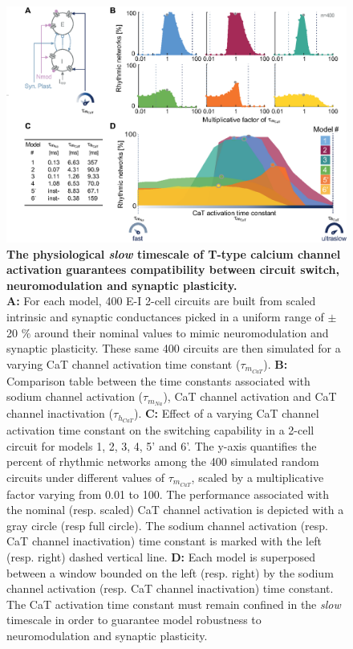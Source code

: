 \begin{figure}[!h]
\includegraphics[scale=0.95]{fig/Plos/Fig3}
\caption{{\bf The physiological \textit{slow} timescale of T-type calcium channel activation guarantees compatibility between circuit switch, neuromodulation and synaptic plasticity.}\\ \textbf{A:} For each model, 400 E-I 2-cell circuits are built from scaled intrinsic and synaptic conductances picked in a uniform range of $\pm$ 20 $\%$ around their nominal values to mimic neuromodulation and synaptic plasticity.  These same 400 circuits are then simulated for a varying  CaT channel activation time constant ($\tau_{m_{CaT}}$). \textbf{B:} Comparison table between the time constants associated with sodium channel activation ($\tau_{m_{Na}}$), CaT channel activation and CaT channel inactivation ($\tau_{h_{CaT}}$). 
\textbf{C:} Effect of a varying CaT channel activation time constant on the switching capability in a 2-cell circuit for models 1, 2, 3, 4, 5' and 6'. The y-axis quantifies the percent of rhythmic networks among the 400 simulated random circuits under different values of $\tau_{m_{CaT}}$, scaled by a multiplicative factor varying from 0.01 to 100. The performance associated with the nominal (resp. scaled) CaT channel activation is depicted with a gray circle (resp full circle). The sodium channel activation (resp. CaT channel inactivation) time constant is marked with the left (resp. right) dashed vertical line.   
\textbf{D:} Each model is superposed between a window bounded on the left (resp. right) by the sodium channel activation (resp. CaT channel inactivation) time constant.  The CaT activation time constant must remain confined in the \textit{slow} timescale in order to guarantee model robustness to neuromodulation and synaptic plasticity. }
\label{fig:3}
\end{figure}

